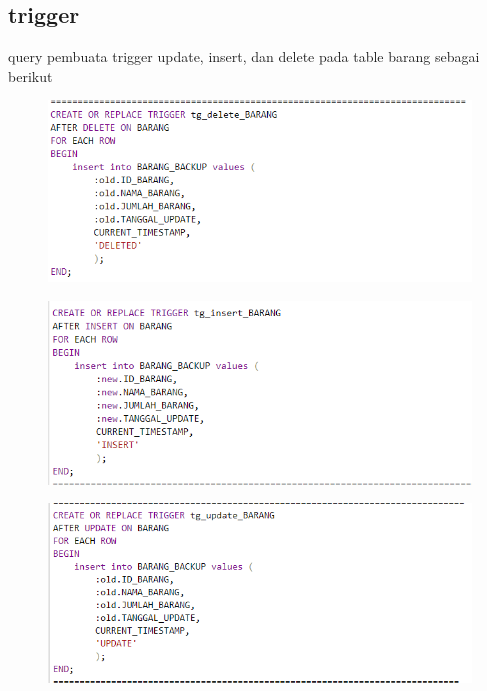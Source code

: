 \documentclass{article}
\begin{document}
\subsection{trigger}
\par query pembuata trigger update, insert, dan delete pada table barang sebagai berikut
\begin{figure}[h]
\includegraphics[scale=0.5]{img/6.PNG}
\end{figure}
\begin{figure}[h]
\includegraphics[scale=0.5]{img/7.PNG}
\end{figure}
\begin{figure}[h]
\includegraphics[scale=0.5]{img/8.PNG}
\end{figure}
\end{document}
